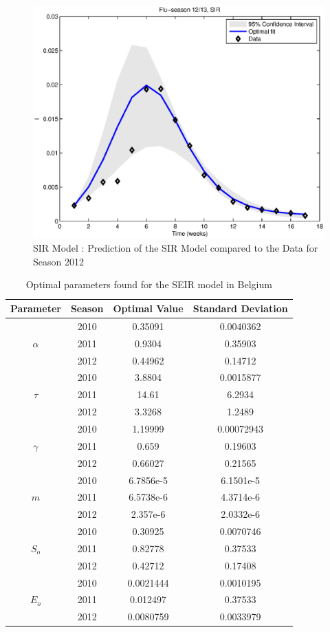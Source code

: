 \documentclass[11pt, a4paper]{article}
\begin{document}
\begin{figure}[h]
    \includegraphics[height = 0.25\textheight]{figures/SIR_prediction_season3.eps}
    \caption{SIR Model : Prediction of the SIR Model compared to the Data for Season 2012}
    \label{fig:sir_pred3}
\end{figure}


\begin{table}[H]
\FloatBarrier
\centering
\begin{tabular}{| c | c | c | c |}
    \hline
    Parameter & Season & Optimal Value &  Standard Deviation\\ \hline
    \multirow{3}{*}{$\alpha$} & 2010 & 0.35091 & 0.0040362\\
    & 2011 & 0.9304 & 0.35903\\
    & 2012 & 0.44962 & 0.14712 \\ \hline
    \multirow{3}{*}{$\tau$} & 2010 & 3.8804 & 0.0015877 \\ 
    & 2011 & 14.61 & 6.2934 \\
    & 2012 & 3.3268 & 1.2489\\ \hline
    \multirow{3}{*}{$\gamma$} & 2010 & 1.19999 & 0.00072943\\
    & 2011 & 0.659 & 0.19603 \\ 
    & 2012 & 0.66027 & 0.21565 \\ \hline
    \multirow{3}{*}{$m$} & 2010 & 6.7856e-5 & 6.1501e-5 \\ 
    & 2011 & 6.5738e-6 & 4.3714e-6 \\
    & 2012 & 2.357e-6 & 2.0332e-6 \\ \hline
    \multirow{3}{*}{$S_o$} & 2010 & 0.30925 & 0.0070746 \\ 
    & 2011 & 0.82778 & 0.37533 \\ 
    & 2012 & 0.42712 & 0.17408 \\ \hline
    \multirow{3}{*}{$E_o$} & 2010 & 0.0021444 & 0.0010195\\
    & 2011 & 0.012497 & 0.37533 \\ 
    & 2012 & 0.0080759 & 0.0033979 \\ \hline
    \end{tabular}
    \caption{Optimal parameters found for the SEIR model in Belgium}
    \label{tab:seirDRAM}
\end{table}
\end{document}
